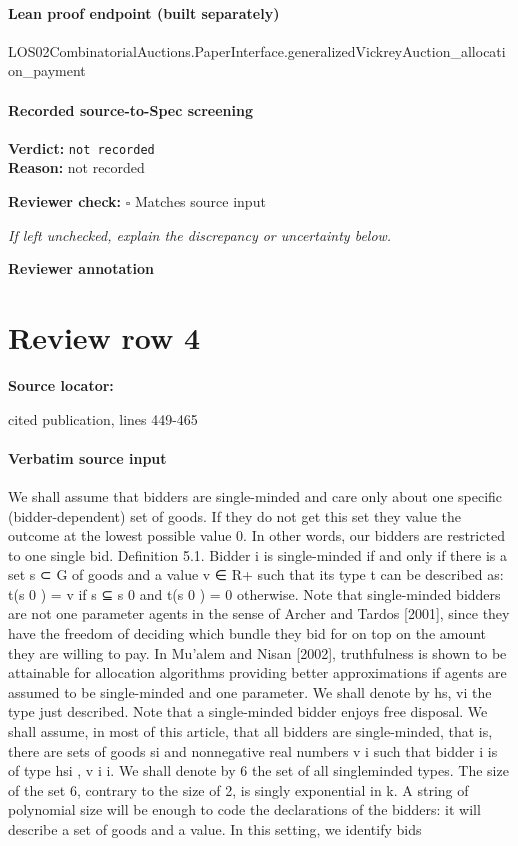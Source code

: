 \documentclass[10pt]{article}
\newcommand{\reviewerbox}{%
  \par\noindent\fbox{\parbox{0.96\linewidth}{\rule{0pt}{0.38in}}}\par
}
\newcommand{\reviewmatch}[1]{%
  \par\noindent\textbf{Reviewer check:} $\square$\; #1\par
  \noindent\emph{If left unchecked, explain the discrepancy or uncertainty below.}\par
}
\begin{document}
\paragraph{Lean proof endpoint (built separately)}\begin{ReviewVerbatim}
LOS02CombinatorialAuctions.PaperInterface.generalizedVickreyAuction_allocation_payment
\end{ReviewVerbatim}

\paragraph{Recorded source-to-Spec screening}
\textbf{Verdict:} \texttt{not recorded}
\\
\textbf{Reason:} not recorded
\reviewmatch{Matches source input}
\noindent\textbf{Reviewer annotation}\par
\reviewerbox
\clearpage
\hypertarget{source-claim-c9e7c200f4c7853a}{}
\section*{Review row 4}
\textbf{Source locator:} {\footnotesize\raggedright cited publication, lines 449-\allowbreak{}465\par}
\paragraph{Verbatim source input}
\begin{ReviewVerbatim}
We shall assume that bidders are single-minded and care only about one specific
(bidder-dependent) set of goods. If they do not get this set they value the outcome
at the lowest possible value 0. In other words, our bidders are restricted to one
single bid.
Definition 5.1. Bidder i is single-minded if and only if there is a set s ⊂ G of
goods and a value v ∈ R+ such that its type t can be described as: t(s 0 ) = v if s ⊆ s 0
and t(s 0 ) = 0 otherwise.
Note that single-minded bidders are not one parameter agents in the sense
of Archer and Tardos [2001], since they have the freedom of deciding which bundle
they bid for on top on the amount they are willing to pay. In Mu’alem and Nisan
[2002], truthfulness is shown to be attainable for allocation algorithms providing
better approximations if agents are assumed to be single-minded and one parameter. We shall denote by hs, vi the type just described. Note that a single-minded
bidder enjoys free disposal. We shall assume, in most of this article, that all bidders
are single-minded, that is, there are sets of goods si and nonnegative real numbers
v i such that bidder i is of type hsi , v i i. We shall denote by 6 the set of all singleminded types. The size of the set 6, contrary to the size of 2, is singly exponential
in k. A string of polynomial size will be enough to code the declarations of the
bidders: it will describe a set of goods and a value. In this setting, we identify bids
\end{ReviewVerbatim}
\end{document}
